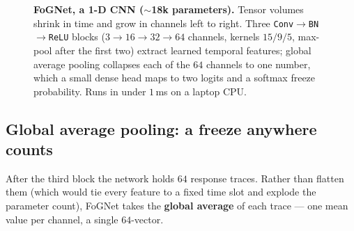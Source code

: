 \begin{figure}[H]
{}
\caption{\textbf{FoGNet, a 1-D CNN ($\sim$18k parameters).} Tensor volumes shrink in
time and grow in channels left to right. Three \texttt{Conv$\to$BN$\to$ReLU} blocks
($3\!\to\!16\!\to\!32\!\to\!64$ channels, kernels $15/9/5$, max-pool after the first
two) extract learned temporal features; global average pooling collapses each of the
$64$ channels to one number, which a small dense head maps to two logits and a
softmax freeze probability. Runs in under $1$\,ms on a laptop CPU.}
\label{fig:fognet}
\end{figure}

\subsection{Global average pooling: a freeze anywhere counts}

After the third block the network holds $64$ response traces. Rather than flatten them
(which would tie every feature to a fixed time slot and explode the parameter count),
FoGNet takes the \textbf{global average} of each trace --- one mean value per channel,
a single $64$-vector.

